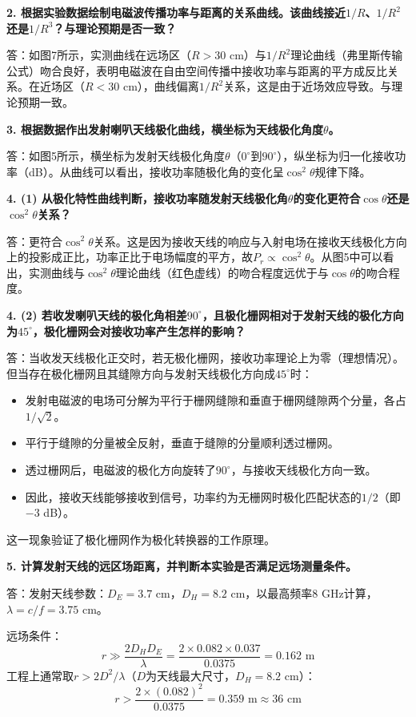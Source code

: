 \documentclass[12pt,a4paper]{article}
\begin{document}
\textbf{2. 根据实验数据绘制电磁波传播功率与距离的关系曲线。该曲线接近$1/R$、$1/R^2$还是$1/R^3$？与理论预期是否一致？}

答：如图7所示，实测曲线在远场区（$R > 30$ cm）与$1/R^2$理论曲线（弗里斯传输公式）吻合良好，表明电磁波在自由空间传播中接收功率与距离的平方成反比关系。在近场区（$R < 30$ cm），曲线偏离$1/R^2$关系，这是由于近场效应导致。与理论预期一致。


\textbf{3. 根据数据作出发射喇叭天线极化曲线，横坐标为天线极化角度$\theta$。}

答：如图5所示，横坐标为发射天线极化角度$\theta$（$0^\circ$到$90^\circ$），纵坐标为归一化接收功率（dB）。从曲线可以看出，接收功率随极化角的变化呈$\cos^2\theta$规律下降。


\textbf{4. (1) 从极化特性曲线判断，接收功率随发射天线极化角$\theta$的变化更符合$\cos\theta$还是$\cos^2\theta$关系？}

答：更符合$\cos^2\theta$关系。这是因为接收天线的响应与入射电场在接收天线极化方向上的投影成正比，功率正比于电场幅度的平方，故$P_r \propto \cos^2\theta$。从图5中可以看出，实测曲线与$\cos^2\theta$理论曲线（红色虚线）的吻合程度远优于与$\cos\theta$的吻合程度。


\textbf{4. (2) 若收发喇叭天线的极化角相差$90^\circ$，且极化栅网相对于发射天线的极化方向为$45^\circ$，极化栅网会对接收功率产生怎样的影响？}

答：当收发天线极化正交时，若无极化栅网，接收功率理论上为零（理想情况）。但当存在极化栅网且其缝隙方向与发射天线极化方向成$45^\circ$时：
\begin{itemize}
    \item 发射电磁波的电场可分解为平行于栅网缝隙和垂直于栅网缝隙两个分量，各占$1/\sqrt{2}$。
    \item 平行于缝隙的分量被全反射，垂直于缝隙的分量顺利透过栅网。
    \item 透过栅网后，电磁波的极化方向旋转了$90^\circ$，与接收天线极化方向一致。
    \item 因此，接收天线能够接收到信号，功率约为无栅网时极化匹配状态的$1/2$（即$-3$ dB）。
\end{itemize}
这一现象验证了极化栅网作为极化转换器的工作原理。


\textbf{5. 计算发射天线的远区场距离，并判断本实验是否满足远场测量条件。}

答：发射天线参数：$D_E = 3.7$ cm，$D_H = 8.2$ cm，以最高频率8 GHz计算，$\lambda = c/f = 3.75$ cm。

远场条件：
\[
r \gg \frac{2D_H D_E}{\lambda} = \frac{2 \times 0.082 \times 0.037}{0.0375} = 0.162\text{ m}
\]
工程上通常取$r > 2D^2/\lambda$（$D$为天线最大尺寸，$D_H = 8.2$ cm）：
\[
r > \frac{2 \times (0.082)^2}{0.0375} = 0.359\text{ m} \approx 36\text{ cm}
\]
\end{document}
